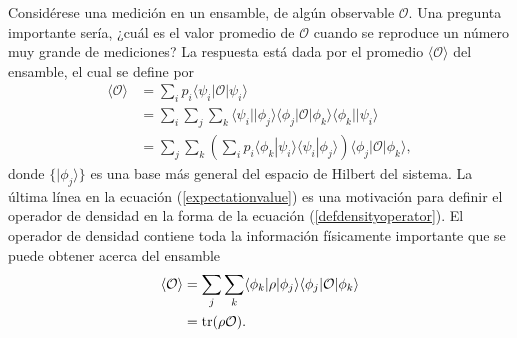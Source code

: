 Considérese una medición en un ensamble, de algún observable $\mathcal{O}$. Una
pregunta importante sería, ¿cuál es el valor promedio de $\mathcal{O}$ cuando
se reproduce un número muy grande de mediciones? La respuesta está dada por el
promedio $\langle \mathcal{O} \rangle$ del ensamble, el cual se define por
{\cite{sakurai2017modern}} \begin{equation}
 	\label{expectationvalue}
 	 \begin{split}
 		\langle \mathcal{O} \rangle &= \sum_{i}p_i \langle\psi_i|\mathcal{O}|\psi_i\rangle\\
 		&=\sum_i\sum_{j}\sum_k \langle\psi_i||\phi_j\rangle \langle \phi_j|\mathcal{O}|\phi_k\rangle \langle \phi_k||\psi_i\rangle\\
 		&=\sum_{j}\sum_k \left(\sum_{i} p_i \langle \phi_k|\psi_i\rangle  \langle\psi_i|\phi_j\rangle\right) \langle \phi_j|\mathcal{O}|\phi_k\rangle, 
 	\end{split}
\end{equation} donde $\{|\phi_j\rangle \}$ es una base más general del espacio de Hilbert del sistema. La última línea en la ecuación ({\ref{expectationvalue}}) es una
motivación para  definir el operador de densidad  en la forma de la ecuación
({\ref{defdensityoperator}}). El operador de densidad contiene toda la
información físicamente importante que se puede obtener acerca del ensamble
{\cite{sakurai2017modern}}\begin{equation}
 	\label{expectationvalue_traza}
 	\begin{split}
 		\langle \mathcal{O} \rangle &=\sum_{j}\sum_k \langle \phi_k|\rho|\phi_j\rangle \langle \phi_j|\mathcal{O}|\phi_k\rangle\\
 		&= \rm{tr}(\rho \mathcal{O}).
 	\end{split}
\end{equation}

